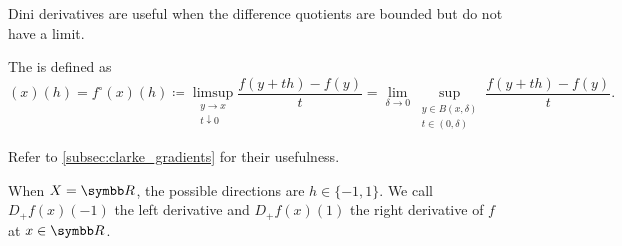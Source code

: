 \begin{definition}
\begin{defenum}
    Dini derivatives are useful when the difference quotients are bounded but do not have a limit.

    \cite[section 10.1]{Clarke2013} The  is defined as
    \begin{equation*}
      [D^\circ f](x)(h)
      =
      f^\circ(x)(h)
      \coloneqq
      \limsup_{\substack{y \to x \\ t \downarrow 0}} \frac {f(y + th) - f(y)} t
      =
      \lim_{\delta \to 0} \sup_{\substack{y \in B(x, \delta) \\ t \in (0, \delta)}} \frac {f(y + th) - f(y)} t.
    \end{equation*}

    Refer to \cref{subsec:clarke_gradients} for their usefulness.
  \end{defenum}

  When \( X = \R \), the possible directions are \( h \in \{ -1, 1 \} \). We call \( D_+ f(x)(-1) \) the left derivative and \( D_+ f(x)(1) \) the right derivative of \( f \) at \( x \in \R \).
\end{definition}

